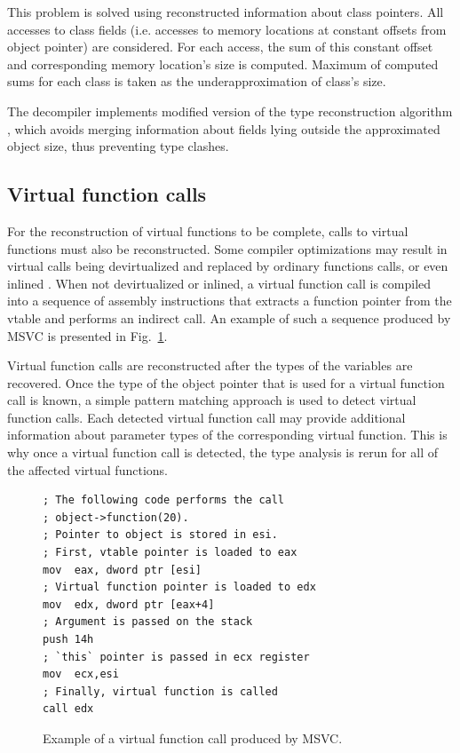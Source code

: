 \documentclass[10pt, conference, compsocconf]{IEEEtran}
\newcommand{\skipsectionspace}{}
\begin{document}
This problem is solved using reconstructed information about class pointers. 
All accesses to class fields (i.e. accesses to memory locations at constant
offsets from object pointer) are considered. For each access, the sum
of this constant offset and corresponding memory location's size is computed.
Maximum of computed sums for each class is taken as the underapproximation of
class's size.

The decompiler implements modified version of the type reconstruction
algorithm \cite{scam2010}, which avoids merging information about fields
lying outside the approximated object size, thus preventing type clashes.


\subsection{Virtual function calls}\skipsectionspace

For the reconstruction of virtual functions to be complete, calls to virtual functions
must also be reconstructed. 
Some compiler optimizations may result in virtual calls being
devirtualized and replaced by ordinary functions calls, or even inlined \cite{namolaru06, bacon96, porat96}.
When not devirtualized or inlined, a virtual function call is compiled into 
a sequence of assembly instructions that extracts a function pointer from
the vtable and performs an indirect call. 
An example of such a sequence produced by MSVC is presented in Fig.~\ref{fig:vcall}.

Virtual function calls are reconstructed after the types of the variables are recovered.
Once the type of the object pointer that is used for a virtual function call is known, 
a simple pattern matching approach is used to detect virtual function calls.
Each detected virtual function call may provide additional information about
parameter types of the corresponding virtual function. 
This is why once a virtual function call is detected, 
the type analysis is rerun for all of the affected virtual functions.

\begin{figure}[tb!]
\centering
{
\lstset{basicstyle=\scriptsize, language=[x86masm]Assembler}
\begin{lstlisting}
; The following code performs the call 
; object->function(20).
; Pointer to object is stored in esi.
; First, vtable pointer is loaded to eax
mov  eax, dword ptr [esi]
; Virtual function pointer is loaded to edx
mov  edx, dword ptr [eax+4] 
; Argument is passed on the stack
push 14h  
; `this` pointer is passed in ecx register
mov  ecx,esi
; Finally, virtual function is called
call edx  
\end{lstlisting}
}
\caption{Example of a virtual function call produced by MSVC.}
\label{fig:vcall}
\end{figure}
\end{document}
